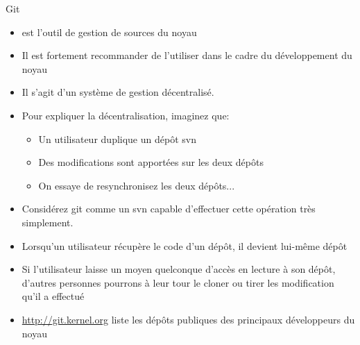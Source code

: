\begin{frame}[fragile=singleslide]{Git}
  \begin{itemize} 
  \item {} est l'outil de gestion de sources du noyau
  \item Il  est fortement recommander  de l'utiliser dans le  cadre du
    développement du noyau
  \item Il s'agit d'un système de gestion décentralisé. 
  \item Pour expliquer la décentralisation, imaginez que:
    \begin{itemize} 
    \item Un utilisateur duplique un dépôt svn
    \item Des modifications sont apportées sur les deux dépôts
    \item On essaye de resynchronisez les deux dépôts...
    \end{itemize}
  \item  Considérez  git  comme   un  svn  capable  d'effectuer  cette
    opération très simplement.
  \item Lorsqu'un utilisateur récupère  le code d'un dépôt, il devient
    lui-même dépôt
  \item Si l'utilisateur laisse un moyen quelconque d'accès en lecture
    à son dépôt, d'autres personnes  pourrons à leur tour le cloner ou
    tirer les modification qu'il a effectué
  \item  \url{http://git.kernel.org} liste  les  dépôts publiques  des
    principaux développeurs du noyau
  \end{itemize}
\end{frame}

